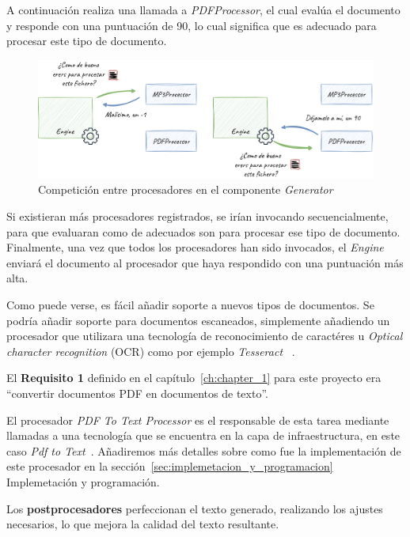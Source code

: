 A continuación realiza una llamada a \textit{PDFProcessor}, el cual evalúa el documento y responde con una puntuación
de 90, lo cual significa que es adecuado para procesar este tipo de documento.

\begin{figure}[ht]
    \begin{center}
        \includegraphics[width=\textwidth]{./chapter/4/images/chapter_4.1.generator_component_processors}
        \caption{Competición entre procesadores en el componente \textit{Generator}}
        \label{fig:chapter_4.1.generator_component_processors}
    \end{center}
\end{figure}

Si existieran más procesadores registrados, se irían invocando secuencialmente, para que evaluaran como de adecuados
son para procesar ese tipo de documento.
Finalmente, una vez que todos los procesadores han sido invocados, el \textit{Engine} enviará el documento al procesador
que haya respondido con una puntuación más alta.

Como puede verse, es fácil añadir soporte a nuevos tipos de documentos.
Se podría añadir soporte para documentos escaneados, simplemente añadiendo un procesador que utilizara una tecnología
de reconocimiento de caractéres u \textit{Optical character recognition} (OCR) como por ejemplo \textit{Tesseract}
~\cite{url_tesseract}.

El \textbf{Requisito 1} definido en el capítulo~\ref{ch:chapter_1} para este proyecto era ``convertir documentos PDF
en documentos de texto''.

El procesador \textit{PDF To Text Processor} es el responsable de esta tarea mediante llamadas a una tecnología que se
encuentra en la capa de infraestructura, en este caso
\textit{Pdf to Text}~\cite{url_pdftotextl}.
Añadiremos más detalles sobre como fue la implementación de este procesador en la
sección~\ref{sec:implemetacion_y_programacion} Implemetación y programación.


Los \textbf{postprocesadores} perfeccionan el texto generado, realizando los ajustes necesarios, lo que mejora la
calidad del texto resultante.

